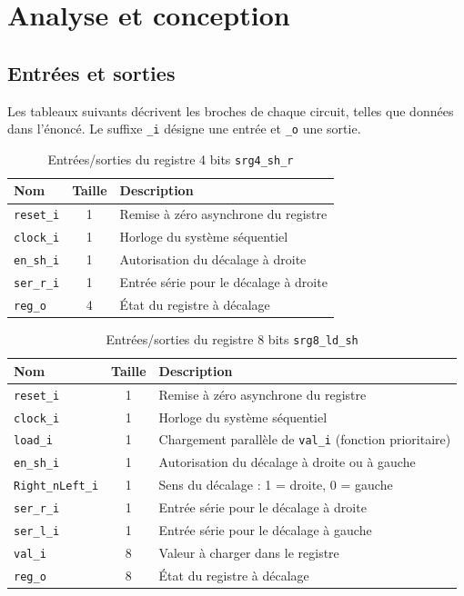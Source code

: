 \section{Analyse et conception}

\subsection{Entrées et sorties}

Les tableaux suivants décrivent les broches de chaque circuit, telles que données dans l'énoncé. Le suffixe \texttt{\_i} désigne une entrée et \texttt{\_o} une sortie.

\begin{table}[H]
  \centering
  \small
  \begin{tabular}{l c p{9.5cm}}
    \hline
    \textbf{Nom} & \textbf{Taille} & \textbf{Description} \\
    \hline
    \texttt{reset\_i} & 1 & Remise à zéro asynchrone du registre \\
    \texttt{clock\_i} & 1 & Horloge du système séquentiel \\
    \texttt{en\_sh\_i} & 1 & Autorisation du décalage à droite \\
    \texttt{ser\_r\_i} & 1 & Entrée série pour le décalage à droite \\
    \texttt{reg\_o}   & 4 & État du registre à décalage \\
    \hline
  \end{tabular}
  \caption{Entrées/sorties du registre 4 bits \texttt{srg4\_sh\_r}}
  \label{tab:io_p1}
\end{table}

\begin{table}[H]
  \centering
  \small
  \begin{tabular}{l c p{9.5cm}}
    \hline
    \textbf{Nom} & \textbf{Taille} & \textbf{Description} \\
    \hline
    \texttt{reset\_i} & 1 & Remise à zéro asynchrone du registre \\
    \texttt{clock\_i} & 1 & Horloge du système séquentiel \\
    \texttt{load\_i}  & 1 & Chargement parallèle de \texttt{val\_i} (fonction prioritaire) \\
    \texttt{en\_sh\_i} & 1 & Autorisation du décalage à droite ou à gauche \\
    \texttt{Right\_nLeft\_i} & 1 & Sens du décalage : 1 = droite, 0 = gauche \\
    \texttt{ser\_r\_i} & 1 & Entrée série pour le décalage à droite \\
    \texttt{ser\_l\_i} & 1 & Entrée série pour le décalage à gauche \\
    \texttt{val\_i}   & 8 & Valeur à charger dans le registre \\
    \texttt{reg\_o}   & 8 & État du registre à décalage \\
    \hline
  \end{tabular}
  \caption{Entrées/sorties du registre 8 bits \texttt{srg8\_ld\_sh}}
  \label{tab:io_p2}
\end{table}


